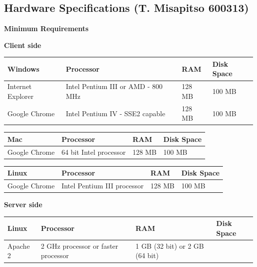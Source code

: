 \documentclass[10pt,onecolumn]{RequimentsGathering}
\begin{document}
	\subsection{Hardware Specifications (T. Misapitso 600313)}
	\textbf{Minimum Requirements}
	\begin{center}
		\textbf{Client side}\\
		\begin{tabular}{ | p{5cm} | p{4cm} | p{3cm} | p{3cm} |}
			\hline
			\textbf{Windows} & \textbf{Processor} & \textbf{RAM} & \textbf{Disk Space}\\ \hline
			Internet Explorer	&	Intel Pentium III	
			or AMD - 800 MHz	&	128 MB	&	100 MB		\\ \hline
			Google Chrome		&	Intel Pentium IV - 
			SSE2 capable		&	128 MB	&	100 MB		\\ \hline
		\end{tabular}
		
		
		\begin{tabular}{ | p{5cm} | p{4cm} | p{3cm} | p{3cm} |}
			\hline
			\textbf{Mac} & \textbf{Processor} & \textbf{RAM} & \textbf{Disk Space}\\			\hline
			Google Chrome		&	64 bit Intel  
			processor	       &   128 MB  &	100 MB	\\ \hline
		\end{tabular}
		
		
		\begin{tabular}{ | p{5cm} | p{4cm} | p{3cm} | p{3cm} |}
			\hline			\textbf{Linux} & \textbf{Processor} & \textbf{RAM} & \textbf{Disk Space}\\
			\hline
			Google Chrome		&	Intel Pentium III  
			processor	       &   128 MB  &	100 MB	\\ \hline
		\end{tabular}
		
		\textbf{Server side}\\
		\begin{tabular}{ | p{5cm} | p{4cm} | p{3cm} | p{3cm} |}
			\hline	
			\textbf{Linux} & \textbf{Processor} & \textbf{RAM} & \textbf{Disk Space}\\
			\hline
			Apache 2		&	2 GHz processor or faster  
			processor	       &   1 GB (32 bit) or 2 GB (64 bit)  &		\\ \hline
		\end{tabular}
	\end{center}
	
\end{document}

